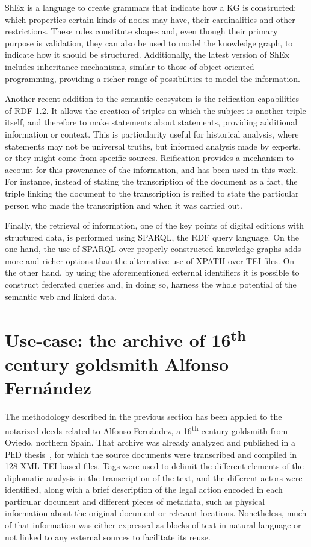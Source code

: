 \documentclass{article}
\begin{document}
ShEx is a language to create grammars that indicate how a KG is constructed: which properties certain kinds of nodes may have, their cardinalities and other restrictions\cite{shex}.
These rules constitute shapes and, even though their primary purpose is validation, they can also be used to model the knowledge graph, to indicate how it should be structured.
Additionally, the latest version of ShEx includes inheritance mechanisms\cite{boneva_inheritance_2025}, similar to those of object oriented programming, providing a richer range of possibilities to model the information.

Another recent addition to the semantic ecosystem is the reification capabilities of RDF 1.2\cite{rdf1.2_2026}.
It allows the creation of triples on which the subject is another triple itself, and therefore to make statements about statements, providing additional information or context.
This is particularity useful for historical analysis, where statements may not be universal truths, but informed analysis made by experts, or they might come from specific sources.
Reification provides a mechanism to account for this provenance of the information, and has been used in this work.
For instance, instead of stating the transcription of the document as a fact, the triple linking the document to the transcription is reified to state the particular person who made the transcription and when it was carried out.

Finally, the retrieval of information, one of the key points of digital editions with structured data, is performed using SPARQL, the RDF query language.
On the one hand, the use of SPARQL over properly constructed knowledge graphs adds more and richer options than the alternative use of XPATH over TEI files.
On the other hand, by using the aforementioned external identifiers it is possible to construct federated queries and, in doing so, harness the whole potential of the semantic web and linked data.


\section{Use-case: the archive of 16\textsuperscript{th} century goldsmith Alfonso Fernández}
\label{use-case}
The methodology described in the previous section has been applied to the notarized deeds related to Alfonso Fernández, a 16\textsuperscript{th} century goldsmith from Oviedo, northern Spain. 
That archive was already analyzed and published in a PhD thesis~\cite{felpeto_cueva_archivo_2023}, for which the source documents were transcribed and compiled in 128 XML-TEI based files.
Tags were used to delimit the different elements of the diplomatic analysis in the transcription of the text, and the different actors were identified, along with a brief description of the legal action encoded in each particular document and different pieces of metadata, such as physical information about the original document or relevant locations.
Nonetheless, much of that information was either expressed as blocks of text in natural language or not linked to any external sources to facilitate its reuse.
\end{document}
